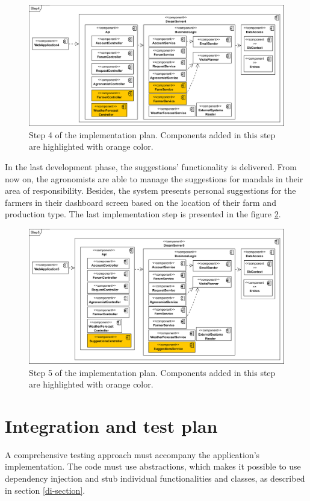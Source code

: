 \begin{figure}[H]
    \centering
    \includegraphics[width=\textwidth]
    {diagrams/implementation-plan/Step4.png}
    \caption{Step 4 of the implementation plan. Components added in this step are highlighted with orange color.}
    \label{fig:step4}
\end{figure}

In the last development phase, the suggestions' functionality is delivered. From now on, the agronomists are able to manage the suggestions for mandals in their area of responsibility. Besides, the system presents personal suggestions for the farmers in their dashboard screen based on the location of their farm and production type. The last implementation step is presented in the figure \ref{fig:step5}.

\begin{figure}[H]
    \centering
    \includegraphics[width=\textwidth]
    {diagrams/implementation-plan/Step5.png}
    \caption{Step 5 of the implementation plan. Components added in this step are highlighted with orange color.}
    \label{fig:step5}
\end{figure}

\section{Integration and test plan}
A comprehensive testing approach must accompany the application's implementation. The code must use abstractions, which makes it possible to use dependency injection and stub individual functionalities and classes, as described in section \ref{di-section}.

